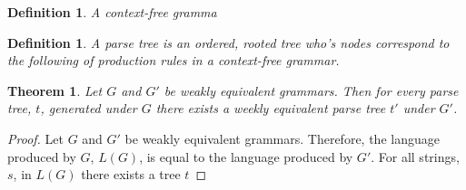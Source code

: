 \documentclass[11pt]{article}
\begin{document}
\newtheorem{cfg}{Definition}
\begin{cfg}
A \em{context-free} gramma
\end{cfg}

\newtheorem{tree}{Definition}
\begin{tree}
A {\em parse tree} is an ordered, rooted tree who's nodes correspond to the
following of production rules in a context-free grammar.
\end{tree}

\newtheorem{parse}{Theorem}
\begin{parse}
Let $G$ and $G'$ be weakly equivalent grammars.
Then for every parse tree, $t$, generated under
$G$ there exists a weekly equivalent parse tree $t'$ under $G'$. 
\end{parse}
\begin{proof}
Let $G$ and $G'$ be weakly equivalent grammars.
Therefore, the language produced by $G$, $L(G)$, is equal to
the language produced by $G'$. For all strings, $s$, in $L(G)$
there exists a tree $t$ 
\end{proof}

{}

\end{document}

